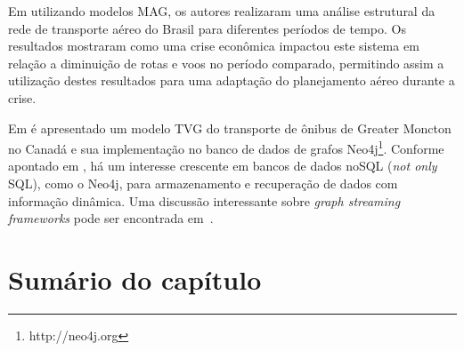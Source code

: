 Em \cite{weh:18} utilizando modelos MAG, os autores realizaram uma análise estrutural da rede de transporte aéreo do Brasil para diferentes períodos de tempo. Os resultados mostraram como uma crise econômica impactou este sistema em relação a diminuição de rotas e voos no período comparado, permitindo assim a utilização destes resultados para uma adaptação do planejamento aéreo durante a crise.

Em \cite{wach:19} é apresentado um modelo TVG do transporte de ônibus de Greater Moncton no Canadá e sua implementação no banco de dados de grafos Neo4j\footnote{http://neo4j.org}. Conforme apontado em \cite{vick:10}, há um interesse crescente em bancos de dados noSQL (\emph{not only} SQL), como o Neo4j, para armazenamento e recuperação de dados com informação dinâmica. Uma discussão interessante sobre \emph{graph streaming frameworks} pode ser encontrada em~\cite{bes:19}.

\section{Sumário do capítulo}


